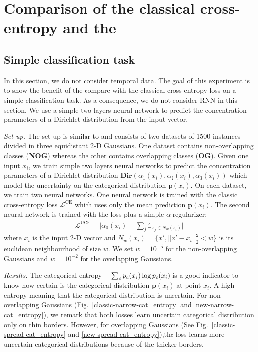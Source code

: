\section{Comparison of the classical cross-entropy and the \UncertaintyLoss}
\label{uncertain_loss_classification}

\subsection{Simple classification task}

In this section, we do not consider temporal data. The goal of this experiment is to show the benefit of the \UncertaintyLoss compare with the classical cross-entropy loss on a simple classification task. As a consequence, we do not consider RNN in this section. We use a simple two layers neural network to predict the concentration parameters of a Dirichlet distribution from the input vector.

\textit{Set-up.} The set-up is similar to \cite{PriorNetworks} and consists of two datasets of 1500 instances divided in three equidistant 2-D Gaussians. One dataset contains non-overlapping classes (\textbf{NOG}) whereas the other contains overlapping classes (\textbf{OG}). Given one input $x_i$, we train simple two layers neural networks to predict the concentration parameters of a Dirichlet distribution $\textbf{Dir}(\alpha_1(x_i), \alpha_2(x_i), \alpha_3(x_i))$ which model the uncertainty on the categorical distribution $\bm{p}(x_i)$. On each dataset, we train two neural networks. One neural network is trained with the classic cross-entropy loss $\mathcal{L}^{\text{CE}}$ which uses only the mean prediction $\bar{\bm{p}}(x_i)$. The second neural network is trained with the \UncertaintyLoss loss plus a simple $\alpha$-regularizer:
\begin{equation}
\begin{aligned}
\mathcal{L}^{\text{UCE}} + \bigl\lvert\alpha_0(x_i) - \sum_j  \mathbb{1}_{x_j \in N_w(x_i) }\bigr\rvert
\end{aligned}
\end{equation}
where $x_i$ is the input 2-D vector and $N_w(x_i) = \{x', ||x' - x_i||_2^2 < w\}$ is its euclidean neighbourhood of size $w$. We set $w=10^{-5}$ for the non-overlapping Gaussians and $w=10^{-2}$ for the overlapping Gaussians.

\textit{Results.} The categorical entropy $-\sum_c p_c(x_i) \log p_c(x_i)$ is a good indicator to know how certain is the categorical distribution $\bm{p}(x_i)$ at point $x_i$. A high entropy meaning that the categorical distribution is uncertain. For non overlapping Gaussians (Fig.\ \ref{classic-narrow-cat_entropy} and \ref{new-narrow-cat_entropy}), we remark that both losses learn uncertain categorical distribution only on thin borders. However, for overlapping Gaussians (See Fig.\ \ref{classic-spread-cat_entropy} and \ref{new-spread-cat_entropy}),the \UncertaintyLoss loss learns more uncertain categorical distributions because of the thicker borders.


